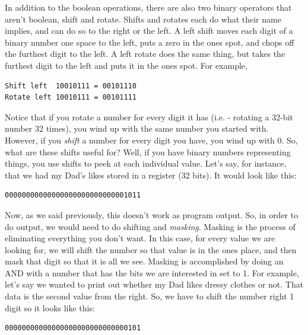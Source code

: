 In addition to the boolean operations, there
are also two binary operators that aren't boolean, shift and rotate.
Shifts and rotates each do what their name implies, and can do so to
the right or the left.  A left shift moves each digit of a binary number
one space to the left, puts a zero in the ones spot, and chops off
the furthest digit to the left.  A left rotate does the same thing, but
takes the furthest digit to the left and puts it in the ones spot.  For
example,

\begin{simpletyping}
\begin{lstlisting}
Shift left  10010111 = 00101110
Rotate left 10010111 = 00101111
\end{lstlisting}
\end{simpletyping}

Notice that if you rotate a number for every digit it has (i.e. - rotating a 32-bit number 32 times), you wind up
with the same number you started with.  However, if you \emph{shift} a number for every digit 
you have, you wind up with 0.  So, what are these shifts useful for?
Well, if you have binary numbers representing things, you use shifts
to peek at each individual value.  Let's say, for instance, that
we had my Dad's likes stored in a register (32 bits).  It
would look like this:

\begin{simpletyping}
\begin{lstlisting}
00000000000000000000000000001011
\end{lstlisting}
\end{simpletyping}

Now, as we said previously, this doesn't work as program output.  So,
in order to do output, we would need to do shifting and 
\emph{masking}.  Masking is the process of eliminating
everything you don't want.  In this case, for every value we are looking
for, we will shift the number so that value is in the ones place, and
then mask that digit so that it is all we see.  Masking is accomplished
by doing an AND 
with a number that has the bits we are interested in set to 1.
For example, let's say
we wanted to print out whether my Dad likes dressy clothes or not.  That
data is the second value from the right.  So, we have to shift the
number right 1 digit so it looks like this:

\begin{simpletyping}
\begin{lstlisting}
00000000000000000000000000000101
\end{lstlisting}
\end{simpletyping}

